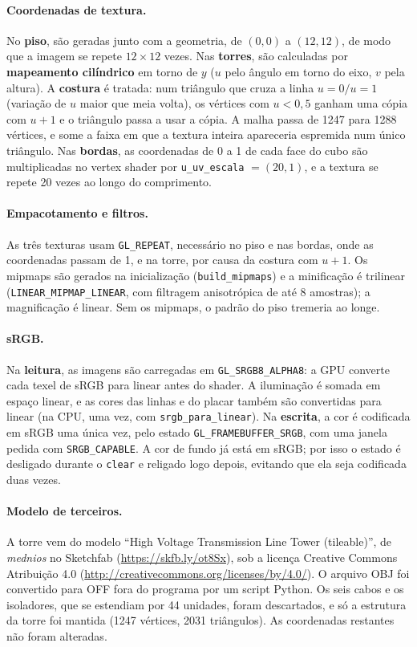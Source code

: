 \documentclass[a4paper,11pt]{article}
\begin{document}
\paragraph{Coordenadas de textura.} No \textbf{piso}, são geradas junto com a
geometria, de $(0,0)$ a $(12,12)$, de modo que a imagem se repete $12\times12$
vezes. Nas \textbf{torres}, são calculadas por \textbf{mapeamento cilíndrico}
em torno de $y$ ($u$ pelo ângulo em torno do eixo, $v$ pela altura). A
\textbf{costura} é tratada: num triângulo que cruza a linha $u=0/u=1$ (variação
de $u$ maior que meia volta), os vértices com $u<0{,}5$ ganham uma cópia com
$u+1$ e o triângulo passa a usar a cópia. A malha passa de 1247 para 1288
vértices, e some a faixa em que a textura inteira apareceria espremida num único triângulo. Nas \textbf{bordas}, as coordenadas de 0 a 1 de cada face do cubo são multiplicadas no vertex shader por \texttt{u\_uv\_escala} $=(20,1)$, e a textura se repete 20 vezes ao longo do comprimento.

\paragraph{Empacotamento e filtros.} As três texturas usam \texttt{GL\_REPEAT}, necessário no piso e nas bordas, onde as coordenadas passam de 1, e na torre, por causa da costura com $u+1$. Os mipmaps são gerados na inicialização
(\texttt{build\_mipmaps}) e a minificação é trilinear
(\texttt{LINEAR\_MIPMAP\_LINEAR}, com filtragem anisotrópica de até 8 amostras);
a magnificação é linear. Sem os mipmaps, o padrão do piso tremeria ao longe.

\paragraph{sRGB.} Na \textbf{leitura}, as imagens são carregadas em
\texttt{GL\_SRGB8\_ALPHA8}: a GPU converte cada texel de sRGB para linear antes do
shader. A iluminação é somada em espaço linear, e as cores das linhas e do
placar também são convertidas para linear (na CPU, uma vez, com
\texttt{srgb\_para\_linear}). Na \textbf{escrita}, a cor é codificada em sRGB uma
única vez, pelo estado \texttt{GL\_FRAMEBUFFER\_SRGB}, com uma janela pedida com
\texttt{SRGB\_CAPABLE}. A cor de fundo já está em sRGB; por isso o estado é
desligado durante o \texttt{clear} e religado logo depois, evitando que ela seja
codificada duas vezes.

\paragraph{Modelo de terceiros.} A torre vem do modelo ``High Voltage Transmission Line Tower (tileable)'', de \emph{mednios} no Sketchfab (\url{https://skfb.ly/ot8Sx}), sob a licença Creative Commons Atribuição 4.0 (\url{http://creativecommons.org/licenses/by/4.0/}). O arquivo OBJ foi convertido para OFF fora do programa por
um script Python. Os seis cabos e os isoladores, que se estendiam por 44
unidades, foram descartados, e só a estrutura da torre foi mantida
(1247 vértices, 2031 triângulos). As coordenadas restantes não foram alteradas.
\end{document}
